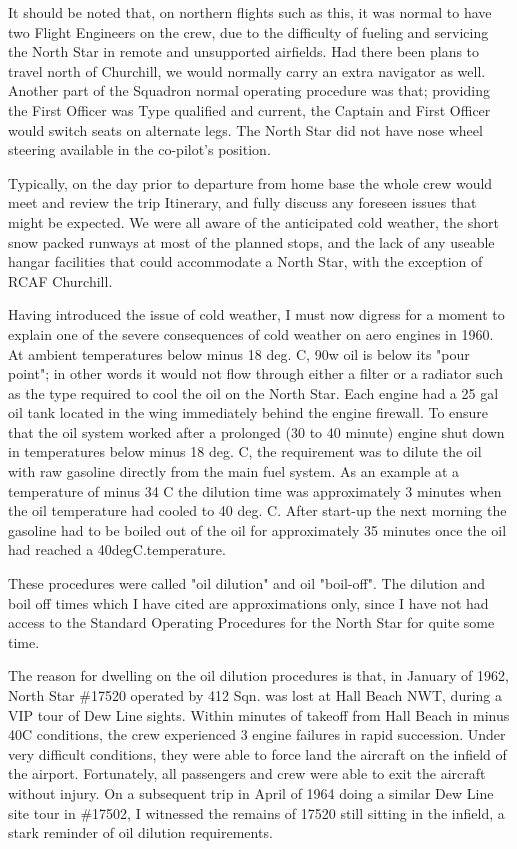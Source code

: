 It should be noted that, on northern flights such as this, it was
normal to have two Flight Engineers on the crew, due to the difficulty
of fueling and servicing the North Star in remote and unsupported
airfields. Had there been plans to travel north of Churchill, we would
normally carry an extra navigator as well. Another part of the Squadron
normal operating procedure was that; providing the First Officer was
Type qualified and current, the Captain and First Officer would switch
seats on alternate legs. The North Star did not have nose wheel
steering available in the co-pilot's position.

Typically, on the day prior to departure from home base the whole crew
would meet and review the trip Itinerary, and fully discuss any
foreseen issues that might be expected. We were all aware of the
anticipated cold weather, the short snow packed runways at most of the
planned stops, and the lack of any useable hangar facilities that could
accommodate a North Star, with the exception of RCAF Churchill.

Having introduced the issue of cold weather, I must now digress for a
moment to explain one of the severe consequences of cold weather on
aero engines in 1960.   At ambient temperatures below minus 18 deg. C,
90w oil is below its "pour point"; in other words it would not flow
through either a filter or a radiator such as the type required to cool
the oil on the North Star. Each engine had a 25 gal oil tank located in
the wing immediately behind the engine firewall. To ensure that the oil
system worked after a prolonged (30 to 40 minute) engine shut down in
temperatures below minus 18 deg. C, the requirement was to dilute the
oil with raw gasoline directly from the main fuel system. As an example
at a temperature of minus 34 C the dilution time was approximately 3
minutes when the oil temperature had cooled to 40 deg. C. After
start-up the next morning the gasoline had to be boiled out of the oil
for approximately 35 minutes once the oil had reached a
40degC.temperature.

These procedures were called "oil dilution" and oil "boil-off". The
dilution and boil off times which I have cited are approximations only,
since I have not had access to the Standard Operating Procedures for
the North Star for quite some time.

The reason for dwelling on the oil dilution procedures is that, in
January of 1962, North Star \#17520 operated by 412 Sqn. was lost at Hall
Beach NWT, during a VIP tour of Dew Line sights. Within minutes of
takeoff from Hall Beach in minus 40C conditions, the crew experienced 3
engine failures in rapid succession. Under very difficult conditions,
they were able to force land the aircraft on the infield of the
airport. Fortunately, all passengers and crew were able to exit the
aircraft without injury. On a subsequent trip in April of 1964 doing a
similar Dew Line site tour in \#17502, I witnessed the remains of 17520
still sitting in the infield, a stark reminder of oil dilution
requirements.

